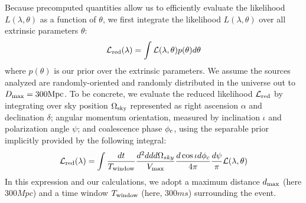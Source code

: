 Because precomputed quantities allow us to efficiently evaluate the likelihood $L(\lambda,\theta)$ as a function of
$\theta$, we first integrate the likelihood $L(\lambda,\theta)$ over all extrinsic parameters $\theta$:
\begin{eqnarray}
{\cal L}_{\rm red}(\lambda) = \int {\cal L}(\lambda,\theta) p(\theta) d\theta
\end{eqnarray}
where $p(\theta)$ is our prior over the extrinsic  parameters.  We assume the sources analyzed are randomly-oriented and
randomly distributed in the universe out to $D_{\rm max}=300 {\rm Mpc}$.  
To be concrete, we evaluate the reduced likelihood ${\cal L}_{\rm red}$ by integrating over sky position $\Omega_{\rm sky}$ represented
as right ascension $\alpha$ and declination $\delta$; angular momentum orientation, measured by inclination $\iota$ and
polarization angle $\psi$;  and coalescence phase $\phi_{\rm c}$, using the separable prior implicitly provided by the
following integral:
\begin{eqnarray}
{\cal L}_{\rm red}(\lambda) = \int \frac{dt}{T_{\rm window}} \frac{d^2 dd d\Omega_{sky} }{V_{\rm max}} \frac{d \cos \iota d\phi_c}{4\pi} \frac{d\psi}{\pi} {\cal L}(\lambda,\theta)
\end{eqnarray}
%
In this expression and our calculations, we adopt a maximum distance $d_{\rm max}$ (here $300 \unit{Mpc}$) and a time window
$ T_{\rm window}$  (here, $300\unit{ms}$)  surrounding the event.  

